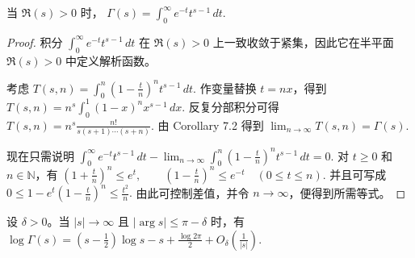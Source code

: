\begin{theorem}
	当 $\Re(s)>0$ 时，
	\(\textstyle \Gamma(s)=\allowbreak{}\int_0^\infty e^{-t}t^{s-1}\,dt.\)
\end{theorem}

\begin{proof}
	积分
	\(\textstyle \int_0^\infty e^{-t}t^{s-1}\,dt\)
	在 $\Re(s)>0$ 上一致收敛于紧集，因此它在半平面 $\Re(s)>0$ 中定义解析函数。

	考虑
	\(\textstyle T(s,\allowbreak{}n)=\allowbreak{}\int_0^n\left(1-\frac{t}{n}\right)^n t^{s-1}\,dt.\)
	作变量替换 $t=nx$，得到
	\(\textstyle T(s,\allowbreak{}n) =\allowbreak{} n^s\int_0^1(1-x)^n x^{s-1}\,dx.\)
	反复分部积分可得
	\(\textstyle T(s,\allowbreak{}n) =\allowbreak{} n^s\frac{n!}{s(s+\allowbreak{}1)\cdots(s+\allowbreak{}n)}.\)
	由 Corollary 7.2 得到
	\(\textstyle \lim_{n\to\allowbreak{}\infty}T(s,\allowbreak{}n)=\allowbreak{}\Gamma(s).\)

	现在只需说明
	\(\textstyle \int_0^\infty e^{-t}t^{s-1}\,dt - \lim_{n\to\allowbreak{}\infty}\int_0^n\left(1-\frac{t}{n}\right)^n t^{s-1}\,dt =\allowbreak{}0.\)
	对 $t\geq0$ 和 $n\in\mathbb N$，有
	\(\textstyle \left(1+\allowbreak{}\frac{t}{n}\right)^n\leq\allowbreak{} e^t,\allowbreak{} \qquad \left(1-\frac{t}{n}\right)^n\leq\allowbreak{} e^{-t} \quad(0\leq\allowbreak{} t\leq\allowbreak{} n).\)
	并且可写成
	\(\textstyle 0\leq\allowbreak{} 1-e^t\left(1-\frac{t}{n}\right)^n\leq\allowbreak{} \frac{t^2}{n}.\)
	由此可控制差值，并令 $n\to\infty$，便得到所需等式。
\end{proof}

\begin{theorem}
	设 $\delta>0$。当 $|s|\to\infty$ 且
	\(\textstyle |\arg s|\leq\allowbreak{} \pi-\delta\)
	时，有
	\(\textstyle \log\Gamma(s) =\allowbreak{} \left(s-\frac12\right)\log s -s+\allowbreak{}\frac{\log 2\pi}{2} +\allowbreak{}O_\delta\left(\frac{1}{|s|}\right).\)
\end{theorem}

